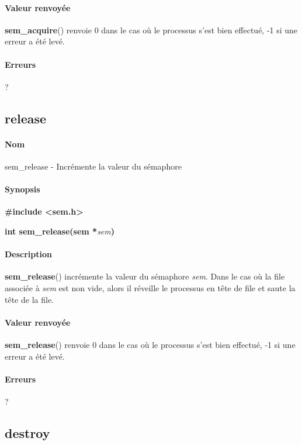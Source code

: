 \documentclass[12pt]{article}
\begin{document}
        \paragraph{Valeur renvoyée\\}
        \textbf{sem\_acquire}() renvoie 0 dans le cas où le processus s'est bien effectué, -1 si une erreur a été levé.
        \paragraph{Erreurs\\}
        ?

    \newpage
    \subsection{release}
        \paragraph{Nom\\}
        sem\_release - Incrémente la valeur du sémaphore
        \paragraph{Synopsis\\}
        \textbf{\#include <sem.h>}

        \textbf{int sem\_release(sem *}\textit{sem}\textbf{)}
        \paragraph{Description\\}
        \textbf{sem\_release}() incrémente la valeur du sémaphore \textit{sem}. Dans le cas où la file associée à \textit{sem} est non vide, alors il réveille le processus en tête de file et saute la tête de la file.

        \paragraph{Valeur renvoyée\\}
        \textbf{sem\_release}() renvoie 0 dans le cas où le processus s'est bien effectué, -1 si une erreur a été levé.
        \paragraph{Erreurs\\}
        ?
    \newpage
    \subsection{destroy}
\end{document}
